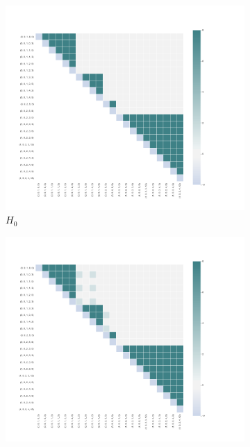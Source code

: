 \begin{figure}[H]
        \centering
        \begin{subfigure}[b]{0.2\textwidth}
            \centering
            \includegraphics[trim={4.3cm 4.1cm 8.4cm 4.1cm}, clip,width=\textwidth]{images/QUBO_h0.png}
            \caption[]%
            {{\small $H_{0}$}}    
            \label{fig:h0}
        \end{subfigure}
        \hfill
        \begin{subfigure}[b]{0.2\textwidth}
            \centering 
            \includegraphics[trim={4.3cm 4.1cm 8.4cm 4.1cm}, clip,width=\textwidth]{images/QUBO_h1.png}

\end{subfigure}
\end{figure}
